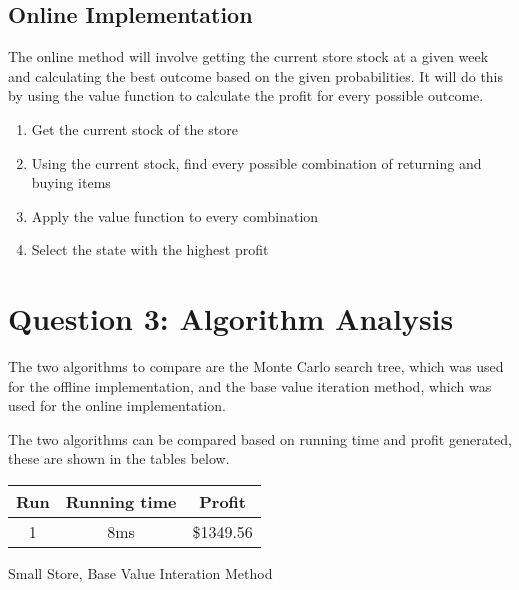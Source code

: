 \documentclass[12pt]{article}
\begin{document}
    \subsection{Online Implementation}

    The online method will involve getting the current store stock at a given week and calculating the best outcome based on the given probabilities. It will do this by using the value function to calculate the profit for every possible outcome.

    \begin{enumerate}
        \item Get the current stock of the store
        \item Using the current stock, find every possible combination of returning and buying items
        \item Apply the value function to every combination
        \item Select the state with the highest profit
    \end{enumerate}

    \section{Question 3: Algorithm Analysis}

    The two algorithms to compare are the Monte Carlo search tree, which was used for the offline implementation, and the base value iteration method, which was used for the online implementation.

    The two algorithms can be compared based on running time and profit generated, these are shown in the tables below.

    \begin{center}
        \begin{tabular}{ |c|c|c| }
            \hline
            Run & Running time & Profit \\
            \hline
            1 & 8ms & \$1349.56\\
            \hline
        \end{tabular}

        \caption{Small Store, Base Value Interation Method}
    \end{center}
\end{document}
